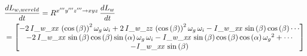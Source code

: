 \begin{equation*}
\begin{split}
&\frac{dL_{w,wereld}}{dt}=R^{x'''y'''z''' \rightarrow xyz}\,\frac{dL_{w}}{dt}\\
&=\begin{bmatrix}
-2\,{\it I\_w\_xx}\, \left( \cos \left( 
\beta \right)  \right) ^{2}\omega_{g}\,\omega_{i}+2\,{\it I\_w\_zz}\,
 \left( \cos \left( \beta \right)  \right) ^{2}\omega_{g}\,\omega_{i}-
{\it I\_w\_xx}\,\sin \left( \beta \right) \cos \left( \beta \right)\cdots 
\\ 
-2\,{\it I\_w\_xx}\,\sin \left( \beta \right) \cos \left( \beta
 \right) \sin \left( \alpha \right) \omega_{g}\,\omega_{i}-{\it 
I\_w\_xx}\,\sin \left( \beta \right) \cos \left( \beta \right) \cos
 \left( \alpha \right) {\omega_{g}}^{2}+\cdots
\\
-{\it I\_w\_xx}\,\sin \left( \beta \right) 

\end{bmatrix}
\end{split}
\end{equation*}
